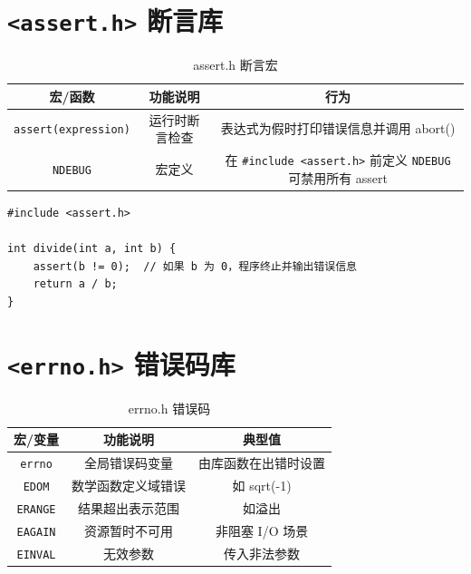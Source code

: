 \section{\texorpdfstring{\texttt{<assert.h>} 断言库}{<assert.h> 断言库}}

\begin{table}[H]
\centering
\renewcommand{\arraystretch}{1.6}
\begin{tabulary}{\linewidth}{CCC}
\toprule
\textbf{宏/函数} & \textbf{功能说明} & \textbf{行为} \\ \midrule
\texttt{assert(expression)} & 运行时断言检查 & 表达式为假时打印错误信息并调用 abort() \\ 
\texttt{NDEBUG} & 宏定义 & 在 \texttt{\#include <assert.h>} 前定义 \texttt{NDEBUG} 可禁用所有 assert \\ \bottomrule
\end{tabulary}
\caption{assert.h 断言宏}
\label{tab:assert_funcs}
\end{table}

\noindent\begin{minipage}{\textwidth}
\begin{lstlisting}[caption={assert 使用示例}]
#include <assert.h>

int divide(int a, int b) {
    assert(b != 0);  // 如果 b 为 0，程序终止并输出错误信息
    return a / b;
}
\end{lstlisting}
\end{minipage}

\section{\texorpdfstring{\texttt{<errno.h>} 错误码库}{<errno.h> 错误码库}}

\begin{table}[H]
\centering
\renewcommand{\arraystretch}{1.6}
\begin{tabulary}{\linewidth}{CCC}
\toprule
\textbf{宏/变量} & \textbf{功能说明} & \textbf{典型值} \\ \midrule
\texttt{errno} & 全局错误码变量 & 由库函数在出错时设置 \\ 
\texttt{EDOM} & 数学函数定义域错误 & 如 sqrt(-1) \\ 
\texttt{ERANGE} & 结果超出表示范围 & 如溢出 \\ 
\texttt{EAGAIN} & 资源暂时不可用 & 非阻塞 I/O 场景 \\ 
\texttt{EINVAL} & 无效参数 & 传入非法参数 \\ \bottomrule
\end{tabulary}
\caption{errno.h 错误码}
\label{tab:errno_funcs}
\end{table}

